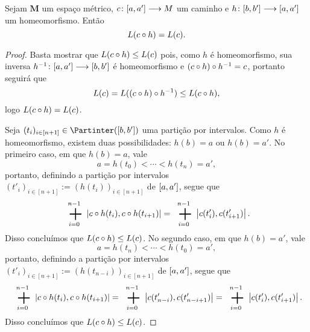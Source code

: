 \begin{proposition}
Sejam $\bm M$ um espaço métrico, ${c}\colon {\left[{a},{a'}\right]} \longrightarrow {M}$ um caminho e ${h}\colon {\left[{b},{b'}\right]} \longrightarrow {\left[{a},{a'}\right]}$ um homeomorfismo. Então
	\begin{equation*}
	L(c \circ h) = L(c).
	\end{equation*}
\end{proposition}
\begin{proof}
Basta mostrar que $L(c \circ h) \leq L(c)$ pois, como $h$ é homeomorfismo, sua inversa ${h^{-1}}\colon {\left[{a},{a'}\right]} \longrightarrow {\left[{b},{b'}\right]}$ é homeomorfismo e $(c \circ h) \circ h^{-1} = c$, portanto seguirá que
	\begin{equation*}
	L(c) = L((c \circ h) \circ h^{-1}) \leq L(c \circ h),
	\end{equation*}
logo $L(c \circ h) = L(c)$.

Seja $(t_i)_{i \in [n+1]} \in \Partinter(\intff{b}{b'})$ uma partição por intervalos. Como $h$ é homeomorfismo, existem duas possibilidades: $h(b)=a$ ou $h(b)=a'$. No primeiro caso, em que $h(b)=a$, vale
	\begin{equation*}
	a = h(t_0) < \cdots < h(t_n) = a',
	\end{equation*}
portanto, definindo a partição por intervalos $(t'_i)_{i \in [n+1]} := (h(t_i))_{i \in [n+1]}$ de $\left[{a},{a'}\right]$, segue que
	\begin{equation*}
	\sum_{i=0}^{n-1} \dist{c\circ h(t_i)}{c \circ h(t_{i+1})} = \sum_{i=0}^{n-1} \dist{c(t'_i)}{c(t'_{i+1})}.
	\end{equation*}
Disso concluímos que $L(c \circ h) \leq L(c)$. No segundo caso, em que $h(b)=a'$, vale
	\begin{equation*}
	a = h(t_n) < \cdots < h(t_0) = a',
	\end{equation*}
portanto, definindo a partição por intervalos $(t'_i)_{i \in [n+1]} := (h(t_{n-i}))_{i \in [n+1]}$ de $\left[{a},{a'}\right]$, segue que
	\begin{equation*}
	\sum_{i=0}^{n-1} \dist{c\circ h(t_i)}{c \circ h(t_{i+1})} = \sum_{i=0}^{n-1} \dist{c(t'_{n-i})}{c(t'_{n-i+1})} = \sum_{i=0}^{n-1} \dist{c(t'_{i})}{c(t'_{i+1})}.
	\end{equation*}
Disso concluímos que $L(c \circ h) \leq L(c)$.
\end{proof}


